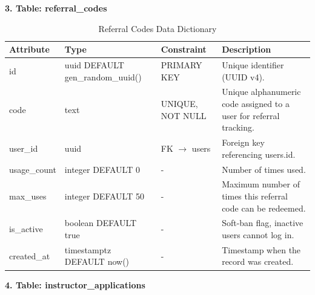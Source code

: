 \documentclass[12pt, oneside]{article} %
\newcommand{\tabbreak}{\hyphenpenalty=200\exhyphenpenalty=200\tolerance=4000\hbadness=10000\hspace{0pt}}
\begin{document}
\textbf{3. Table: referral\_codes}

\begin{table}[H]
\caption{Referral Codes Data Dictionary}
\label{tab:dd_referral_codes}
\vspace{-4mm}
\begin{center}
\renewcommand{\arraystretch}{1.15}
\scriptsize
\begin{tabular}{|>{\raggedright\arraybackslash\tabbreak}p{2.67cm}|>{\raggedright\arraybackslash\tabbreak}p{2.93cm}|>{\raggedright\arraybackslash\tabbreak}p{2.67cm}|>{\raggedright\arraybackslash\tabbreak}p{4.51cm}|}
\hline
\textbf{Attribute} & \textbf{Type} & \textbf{Constraint} & \textbf{Description} \\ \hline
id & uuid DEFAULT gen\_random\_uuid() & PRIMARY KEY & Unique identifier (UUID v4). \\ \hline
code & text & UNIQUE, NOT NULL & Unique alphanumeric code assigned to a user for referral tracking. \\ \hline
user\_id & uuid & FK $\rightarrow$ users & Foreign key referencing users.id. \\ \hline
usage\_count & integer DEFAULT 0 & - & Number of times used. \\ \hline
max\_uses & integer DEFAULT 50 & - & Maximum number of times this referral code can be redeemed. \\ \hline
is\_active & boolean DEFAULT true & - & Soft-ban flag, inactive users cannot log in. \\ \hline
created\_at & timestamptz DEFAULT now() & - & Timestamp when the record was created. \\ \hline
\end{tabular}
\end{center}
\end{table}

\textbf{4. Table: instructor\_applications}
\end{document}

